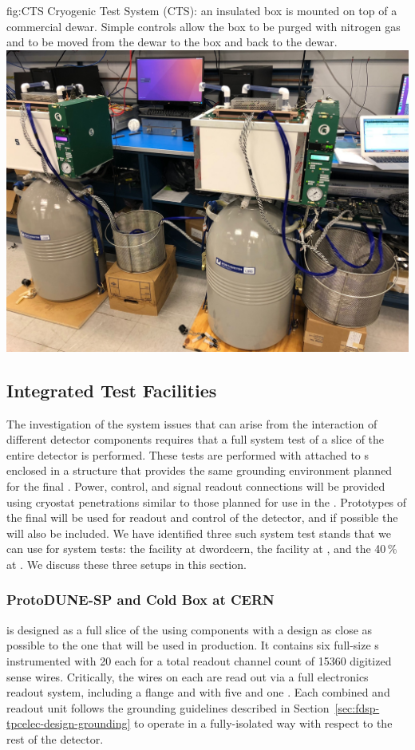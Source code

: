 \begin{dunefigure}
{fig:CTS}
{Cryogenic Test System (CTS): an insulated box is mounted on top of a commercial \lntwo dewar.  Simple controls allow the box to be purged with nitrogen gas and \lntwo to be moved from the dewar to the box and back to the dewar.}
\includegraphics[width=0.4\linewidth]{graphics/sp-tpcelec-CTS2.jpeg}
\end{dunefigure}


\subsection{Integrated Test Facilities}
\label{sec:fdsp-tpcelec-qa-facilities}

The investigation of the system issues that can arise from the interaction 
of different detector components requires that a full system test of a slice
of the entire detector is performed. These tests are performed with 
attached to s enclosed in a structure that provides the same
grounding environment planned for the final  . 
Power, control, and signal readout connections will be provided using cryostat 
penetrations similar to those planned for use in the  .
Prototypes of the final    will be used for readout and
control of the detector, and if possible the  will also be included.
We have identified three such system test stands
that we can use for system tests: the  facility at dword{cern}, the
 facility at , and the \num{40}\,\%  at .
We discuss these three setups in this section.

\subsubsection{ProtoDUNE-SP and Cold Box at CERN}
\label{sec:fdsp-tpcelec-qa-facilities-pdune}

 is designed as a full slice of the    
using components with a design as close as possible to the one that will
be used in production. It contains six full-size 
 s instrumented with \num{20}  each for a 
total readout channel count of \num{15360} digitized sense wires. Critically, 
the wires on each  are read out via a full  electronics readout 
system, including a  flange and  with five  
and one . Each combined  and  readout unit follows 
the grounding guidelines described in Section~\ref{sec:fdsp-tpcelec-design-grounding} 
to operate in a fully-isolated way with respect to the rest of the detector.

